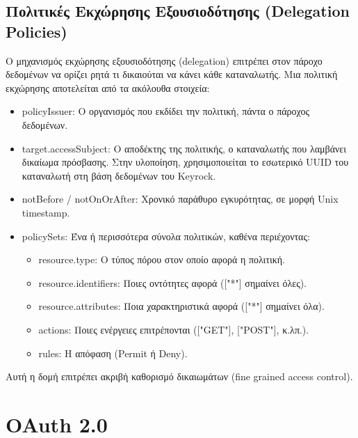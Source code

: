 \subsection{Πολιτικές Εκχώρησης Εξουσιοδότησης (\textlatin{Delegation Policies})}
\label{subsec:delegation}

Ο μηχανισμός εκχώρησης εξουσιοδότησης (\textlatin{delegation}) επιτρέπει
στον πάροχο δεδομένων να ορίζει ρητά τι δικαιούται να κάνει κάθε
καταναλωτής. Μια πολιτική εκχώρησης αποτελείται από τα ακόλουθα στοιχεία:

\begin{itemize}
    \item \textlatin{policyIssuer}: Ο οργανισμός που εκδίδει
    την πολιτική, πάντα ο πάροχος δεδομένων.
    \item \textlatin{target.accessSubject}: Ο αποδέκτης της
    πολιτικής, ο καταναλωτής που λαμβάνει δικαίωμα πρόσβασης.
    Στην υλοποίηση, χρησιμοποιείται το εσωτερικό \textlatin{UUID}
    του καταναλωτή στη βάση δεδομένων του \textlatin{Keyrock}.
    \item \textlatin{notBefore} / \textlatin{notOnOrAfter}:
    Χρονικό παράθυρο εγκυρότητας, σε μορφή \textlatin{Unix timestamp}.
    \item \textlatin{policySets}: Ένα ή περισσότερα σύνολα
    πολιτικών, καθένα περιέχοντας:
    \begin{itemize}
        \item \textlatin{resource.type}: Ο τύπος πόρου στον οποίο
        αφορά η πολιτική.
        \item \textlatin{resource.identifiers}: Ποιες οντότητες
        αφορά (\textlatin{["*"]} σημαίνει όλες).
        \item \textlatin{resource.attributes}: Ποια χαρακτηριστικά
        αφορά (\textlatin{["*"]} σημαίνει όλα).
        \item \textlatin{actions}: Ποιες ενέργειες επιτρέπονται
        (\textlatin{["GET"]}, \textlatin{["POST"]}, κ.λπ.).
        \item \textlatin{rules}: Η απόφαση (\textlatin{Permit} ή
        \textlatin{Deny}).
    \end{itemize}
\end{itemize}

Αυτή η δομή επιτρέπει ακριβή καθορισμό δικαιωμάτων (\textlatin{fine grained access control}).

\section{\textlatin{OAuth 2.0 }}
\label{sec:oauth2} 

